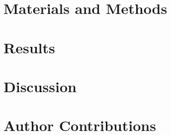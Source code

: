 \documentclass[10pt,twocolumn]{article}
\begin{document}
\section{Materials and Methods}
\label{sec:materiels_and_methods}



\section{Results}
\label{sec:results}



\section{Discussion}
\label{sec:discussion}



\section{Author Contributions}








\appendix
\end{document}
